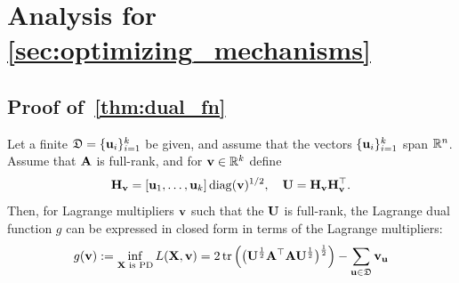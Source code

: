 \section{Analysis for \cref{sec:optimizing_mechanisms}}

\subsection{Proof of~\cref{thm:dual_fn}}\label{app:ssec:dual-proof-multipliers-proof}
\begin{namedtheorem}
Let a finite $\mathfrak{D} = \{\mathbf{u}_i\}_{i=1}^k$ be given, and assume that the vectors $\{\mathbf{u}_i\}_{i=1}^k$ span $\mathbb{R}^n$. Assume that $\mathbf{A}$ is full-rank, and for $\mathbf{v} \in \mathbb{R}^k$ define 
\[
\mathbf{H}_{\mathbf{v}} = [\mathbf{u}_1, \dots, \mathbf{u}_k] \operatorname{diag}(\mathbf{v})^{1/2}, \quad \mathbf{U} = \mathbf{H}_{\mathbf{v}}\mathbf{H}_{\mathbf{v}}^\top.
\]
Then, for Lagrange multipliers $\mathbf{v}$ such that the $\mathbf{U}$ is full-rank, the Lagrange dual function $g$ can be expressed in closed form in terms of the Lagrange multipliers: 
\begin{equation}
g(\mathbf{v}) := \inf_{\mathbf{X}\text{ is PD}} L(\mathbf{X}, \mathbf{v}) = 2\,\mathrm{tr} \left( \big(\mathbf{U}^\frac{1}{2} \mathbf{A}^\top\mathbf{A} \mathbf{U}^\frac{1}{2} \big)^\frac{1}{2} \right) - \sum_{\mathbf{u}\in\mathfrak{D}} \mathbf{v}_{\mathbf{u}}
\end{equation}
\end{namedtheorem}
